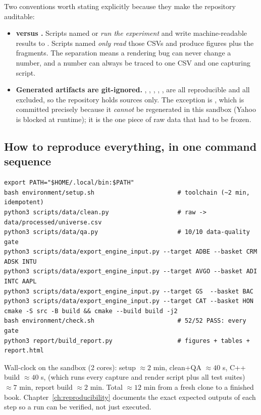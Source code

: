 Two conventions worth stating explicitly because they make the repository auditable:
\begin{itemize}
  \item \textbf{ versus .} Scripts named
     or 
    \emph{run the experiment} and write machine-readable results to
    . Scripts named  \emph{only read}
    those CSVs and produce figures plus the  fragments. The
    separation means a rendering bug can never change a number, and a number can always
    be traced to one CSV and one capturing script.
  \item \textbf{Generated artifacts are git-ignored.} ,
    , , ,
    ,  are all reproducible and all
    excluded, so the repository holds sources only. The exception is
    , which is committed precisely because it
    \emph{cannot} be regenerated in this sandbox (Yahoo is blocked at runtime); it is the
    one piece of raw data that had to be frozen.
\end{itemize}

\subsection{How to reproduce everything, in one command sequence}
\label{sec:phasemap:reproduce}

\begin{verbatim}
export PATH="$HOME/.local/bin:$PATH"
bash environment/setup.sh                       # toolchain (~2 min, idempotent)
python3 scripts/data/clean.py                   # raw -> data/processed/universe.csv
python3 scripts/data/qa.py                      # 10/10 data-quality gate
python3 scripts/data/export_engine_input.py --target ADBE --basket CRM ADSK INTU
python3 scripts/data/export_engine_input.py --target AVGO --basket ADI INTC AAPL
python3 scripts/data/export_engine_input.py --target GS  --basket BAC
python3 scripts/data/export_engine_input.py --target CAT --basket HON
cmake -S src -B build && cmake --build build -j2
bash environment/check.sh                       # 52/52 PASS: every gate
python3 report/build_report.py                  # figures + tables + report.html
\end{verbatim}

Wall-clock on the sandbox (2 cores): setup $\approx2$ min, clean+QA $\approx40$ s, C++
build $\approx40$ s,  (which runs every capture and render script plus all
test suites) $\approx7$ min, report build $\approx2$ min. Total $\approx12$ min from a
fresh clone to a finished book. Chapter~\ref{ch:reproducibility} documents the exact
expected outputs of each step so a run can be verified, not just executed.
